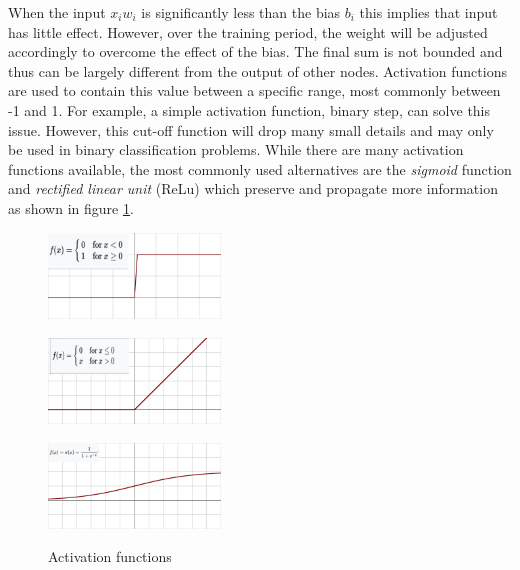 \documentclass[proposal]{softeng}
\begin{document}
When the input \( {x_{i}} {w_{i}} \) is significantly less than the bias \({b_{i}}\) this implies that input has little effect. However, over the training period, the weight will be adjusted accordingly to overcome the effect of the bias. The final sum is not bounded and thus can be largely different from the output of other nodes. Activation functions are used to contain this value between a specific range, most commonly between -1 and 1. For example, a simple activation function, binary step, can solve this issue. However, this cut-off function will drop many small details and may only be used in binary classification problems. While there are many activation functions available, the most commonly used alternatives are the \textit{sigmoid} function and \textit{rectified linear unit} (ReLu) which preserve and propagate more information as shown in figure \ref{activation_funtions}.

\begin{figure}

\centering


{

\includegraphics[width=1.8in]{images/activation_binary_step_1.png}

\label{fig:first_sub}

}


\subfigure[ReLu]

{

\includegraphics[width=1.8in]{images/activation_rectified_linear.png}

\label{fig:second_sub}

}

\subfigure[Sigmoid]

{

\includegraphics[width=1.8in]{images/activation_sigmoid.png}

\label{fig:third_sub}

}

\caption{Activation functions \cite{activationfunction}}

\label{activation_funtions}
\end{figure}
\end{document}
